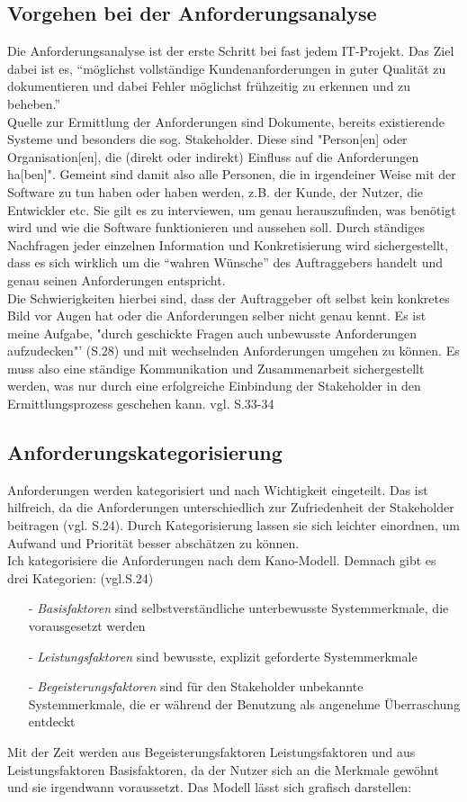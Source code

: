 \documentclass [12pt, a4paper, oneside, titlepage, ngerman]{article}
\begin{document}
\subsection{Vorgehen bei der Anforderungsanalyse}
Die Anforderungsanalyse ist der erste Schritt bei fast jedem IT-Projekt. Das Ziel dabei ist es, "`möglichst vollständige Kundenanforderungen in guter Qualität zu dokumentieren und dabei Fehler möglichst frühzeitig zu erkennen und zu beheben."' \cite[S.11]{PohlRupp2015} \\
Quelle zur Ermittlung der Anforderungen sind Dokumente, bereits existierende Systeme und besonders die sog. Stakeholder. Diese sind {\color {blue}"Person[en] oder Organisation[en], die (direkt oder indirekt) Einfluss auf die Anforderungen ha[ben]".} Gemeint sind damit also alle Personen, die in irgendeiner Weise mit der Software zu tun haben oder haben werden, z.B. der Kunde, der Nutzer, die Entwickler etc. Sie gilt es zu interviewen, um genau herauszufinden, was benötigt wird und wie die Software funktionieren und aussehen soll. Durch ständiges Nachfragen jeder einzelnen Information und Konkretisierung wird sichergestellt, dass es sich wirklich um die "`wahren Wünsche"'  des Auftraggebers handelt und genau seinen Anforderungen entspricht.  \\
Die Schwierigkeiten hierbei sind, dass der Auftraggeber oft selbst kein konkretes Bild vor Augen hat oder die Anforderungen selber nicht genau kennt. Es ist meine Aufgabe, {\color{blue} "durch geschickte Fragen auch unbewusste Anforderungen aufzudecken"' (S.28)}  und mit wechselnden Anforderungen umgehen zu können.
Es muss also eine ständige Kommunikation und Zusammenarbeit sichergestellt werden, was nur durch eine erfolgreiche Einbindung der Stakeholder in den Ermittlungsprozess geschehen kann. {\color{blue} vgl. S.33-34}

\subsection{Anforderungskategorisierung}
Anforderungen werden kategorisiert und nach Wichtigkeit eingeteilt. Das ist hilfreich, da die Anforderungen unterschiedlich zur Zufriedenheit der Stakeholder beitragen (vgl. S.24). Durch Kategorisierung lassen sie sich leichter einordnen, um Aufwand und Priorität besser abschätzen zu können. \\
Ich kategorisiere die Anforderungen nach dem Kano-Modell. Demnach gibt es drei Kategorien: (vgl.S.24) 
\begin{itemize} 
\item[-] \textit{Basisfaktoren} sind selbstverständliche unterbewusste Systemmerkmale, die vorausgesetzt werden 
\item[-] \textit{Leistungsfaktoren} sind bewusste, explizit geforderte Systemmerkmale
\item[-] \textit{Begeisterungsfaktoren} sind für den Stakeholder unbekannte Systemmerkmale, die er während der Benutzung als angenehme Überraschung entdeckt
\end{itemize}
Mit der Zeit werden aus Begeisterungsfaktoren Leistungsfaktoren und aus Leistungsfaktoren Basisfaktoren, da der Nutzer sich an die Merkmale gewöhnt und sie irgendwann voraussetzt. Das Modell lässt sich grafisch darstellen: 
\end{document}
